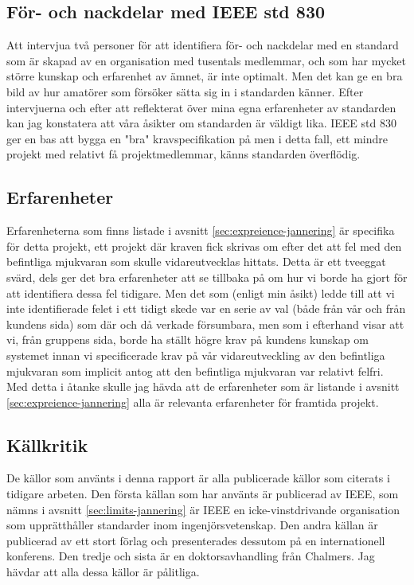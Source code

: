 \subsection{För- och nackdelar med IEEE std 830}
Att intervjua två personer för att identifiera för- och nackdelar med en standard som är skapad av en organisation med tusentals medlemmar, och som har mycket större kunskap och erfarenhet av ämnet, är inte optimalt. Men det kan ge en bra bild av hur amatörer som försöker sätta sig in i standarden känner. Efter intervjuerna och efter att reflekterat över mina egna erfarenheter av standarden kan jag konstatera att våra åsikter om standarden är väldigt lika. IEEE std 830 ger en bas att bygga en "bra" kravspecifikation på men i detta fall, ett mindre projekt med relativt få projektmedlemmar, känns standarden överflödig.   
\subsection{Erfarenheter}
Erfarenheterna som finns listade i avsnitt \ref{sec:expreience-jannering} är specifika för detta projekt, ett projekt där kraven fick skrivas om efter det att fel med den befintliga mjukvaran som skulle vidareutvecklas hittats. Detta är ett tveeggat svärd, dels ger det bra erfarenheter att se tillbaka på om hur vi borde ha gjort för att identifiera dessa fel tidigare. Men det som (enligt min åsikt) ledde till att vi inte identifierade felet i ett tidigt skede var en serie av val (både från vår och från kundens sida) som där och då verkade försumbara, men som i efterhand visar att vi, från gruppens sida, borde ha ställt högre krav på kundens kunskap om systemet innan vi specificerade krav på vår vidareutveckling av den befintliga mjukvaran som implicit antog att den befintliga mjukvaran var relativt felfri. Med detta i åtanke skulle jag hävda att de erfarenheter som är listande i avsnitt \ref{sec:expreience-jannering} alla är relevanta erfarenheter för framtida projekt.      
\subsection{Källkritik}
De källor som använts i denna rapport är alla publicerade källor som citerats i tidigare arbeten. Den första källan som har använts är publicerad av IEEE, som nämns i avsnitt \ref{sec:limits-jannering} är IEEE en icke-vinstdrivande organisation som upprätthåller standarder inom ingenjörsvetenskap. Den andra källan är publicerad av ett stort förlag och presenterades dessutom på en internationell konferens. Den tredje och sista är en doktorsavhandling från Chalmers. Jag hävdar att alla dessa källor är pålitliga.      
